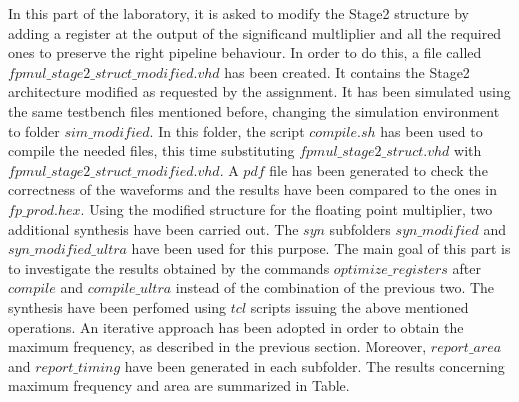 In this part of the laboratory, it is asked to modify the Stage2 structure by adding a register at the output of the significand multliplier and all the required ones to preserve the right pipeline behaviour. In order to do this, a file called $fpmul\_stage2\_struct\_modified.vhd$ has been created. It contains the Stage2 architecture modified as requested by the assignment. It has been simulated using the same testbench files mentioned before, changing the simulation environment to folder $sim\_modified$. In this folder, the script $compile.sh$ has been used to compile the needed files, this time substituting $fpmul\_stage2\_struct.vhd$ with $fpmul\_stage2\_struct\_modified.vhd$. A $pdf$ file has been generated to check the correctness of the waveforms and the results have been compared to the ones in $fp\_prod.hex$.
\newline
\newline
\noindent Using the modified structure for the floating point multiplier, two additional synthesis have been carried out. The $syn$ subfolders $syn\_modified$ and $syn\_modified\_ultra$ have been used for this purpose. The main goal of this part is to investigate the results obtained by the commands $optimize\_registers$ after $compile$ and $compile\_ultra$ instead of the combination of the previous two. The synthesis have been perfomed using $tcl$ scripts issuing the above mentioned operations. An iterative approach has been adopted in order to obtain the maximum frequency, as described in the previous section. Moreover, $report\_area$ and $report\_timing$ have been generated in each subfolder. The results concerning maximum frequency and area are summarized in Table.



